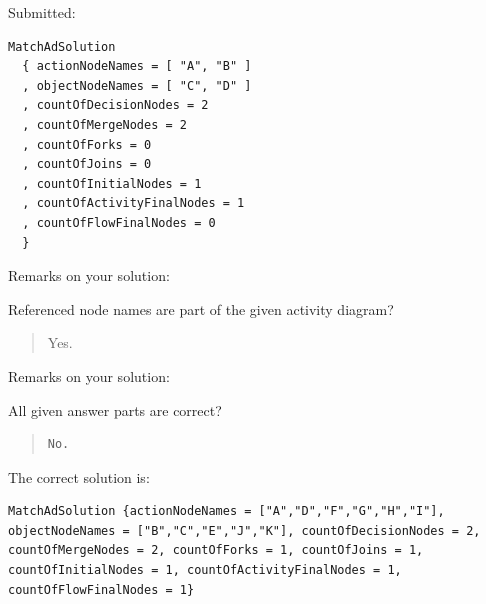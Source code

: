 Submitted:


\begin{verbatim}
MatchAdSolution 
  { actionNodeNames = [ "A", "B" ]
  , objectNodeNames = [ "C", "D" ]
  , countOfDecisionNodes = 2
  , countOfMergeNodes = 2
  , countOfForks = 0
  , countOfJoins = 0
  , countOfInitialNodes = 1
  , countOfActivityFinalNodes = 1
  , countOfFlowFinalNodes = 0 
  }
\end{verbatim}


Remarks on your solution:

Referenced node names are part of the given activity diagram?\begin{quote}Yes.\end{quote}Remarks on your solution:

All given answer parts are correct?

\begin{quote}
\begin{verbatim}
No.
\end{verbatim}
\end{quote}

The correct solution is:
\begin{verbatim}
MatchAdSolution {actionNodeNames = ["A","D","F","G","H","I"], objectNodeNames = ["B","C","E","J","K"], countOfDecisionNodes = 2, countOfMergeNodes = 2, countOfForks = 1, countOfJoins = 1, countOfInitialNodes = 1, countOfActivityFinalNodes = 1, countOfFlowFinalNodes = 1}
\end{verbatim}


